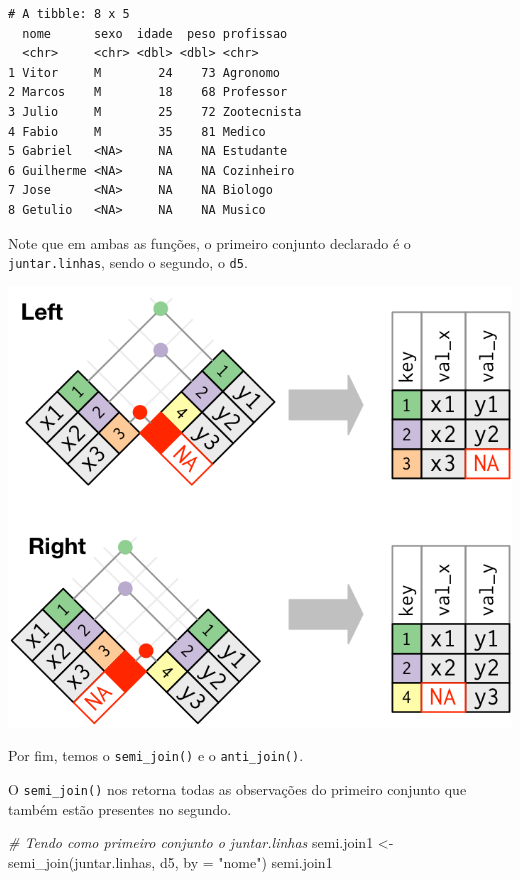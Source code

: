 \documentclass[
  brazilian,
]{book}
\newenvironment{Shaded}{\begin{snugshade}}{\end{snugshade}}
\newcommand{\AttributeTok}[1]{\textcolor[rgb]{0.77,0.63,0.00}{#1}}
\newcommand{\CommentTok}[1]{\textcolor[rgb]{0.56,0.35,0.01}{\textit{#1}}}
\newcommand{\FunctionTok}[1]{\textcolor[rgb]{0.00,0.00,0.00}{#1}}
\newcommand{\NormalTok}[1]{#1}
\newcommand{\OtherTok}[1]{\textcolor[rgb]{0.56,0.35,0.01}{#1}}
\newcommand{\StringTok}[1]{\textcolor[rgb]{0.31,0.60,0.02}{#1}}
\let\origfigure\figure
\let\endorigfigure\endfigure
\renewenvironment{figure}[1][2] {
    \expandafter\origfigure\expandafter[H]
} {
    \endorigfigure
}
\begin{document}
\begin{verbatim}
# A tibble: 8 x 5
  nome      sexo  idade  peso profissao  
  <chr>     <chr> <dbl> <dbl> <chr>      
1 Vitor     M        24    73 Agronomo   
2 Marcos    M        18    68 Professor  
3 Julio     M        25    72 Zootecnista
4 Fabio     M        35    81 Medico     
5 Gabriel   <NA>     NA    NA Estudante  
6 Guilherme <NA>     NA    NA Cozinheiro 
7 Jose      <NA>     NA    NA Biologo    
8 Getulio   <NA>     NA    NA Musico     
\end{verbatim}

Note que em ambas as funções, o primeiro conjunto declarado é o \texttt{juntar.linhas}, sendo o segundo, o \texttt{d5}.

\begin{figure}

{\centering \includegraphics[width=0.5\linewidth]{imagens/join-rl} 

}

\caption{Esquematização das funções left-join e right-join. Fonte: R for Data Science, 2017.}\label{fig:unnamed-chunk-177}
\end{figure}

Por fim, temos o \texttt{semi\_join()} e o \texttt{anti\_join()}.

O \texttt{semi\_join()} nos retorna todas as observações do primeiro conjunto que também estão presentes no segundo.

\begin{Shaded}
\begin{Highlighting}[]
\CommentTok{\# Tendo como primeiro conjunto o \textasciigrave{}juntar.linhas\textasciigrave{}}
\NormalTok{semi.join1 }\OtherTok{\textless{}{-}} \FunctionTok{semi\_join}\NormalTok{(juntar.linhas, d5, }\AttributeTok{by =} \StringTok{"nome"}\NormalTok{)}
\NormalTok{semi.join1}
\end{Highlighting}
\end{Shaded}
\end{document}
